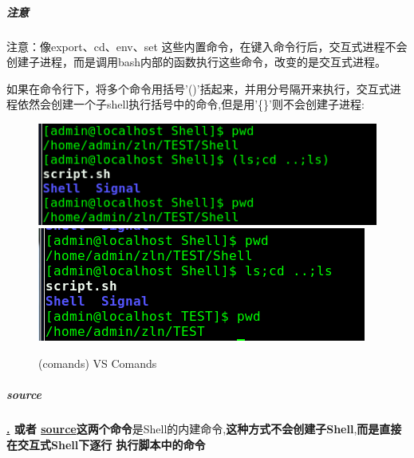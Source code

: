 \documentclass[UTF8,a4paper,12pt]{ctexbook}
\begin{document}
				 \subparagraph{注意}注意：像export、cd、env、set 这些内置命令，在键入命令行后，交互式进程不会创建子进程，而是调用bash内部的函数执行这些命令，改变的是交互式进程。
				 
				 如果在命令行下，将多个命令用括号'()'括起来，并用分号隔开来执行，交互式进程依然会创建一个子shell执行括号中的命令,但是用'\{\}'则不会创建子进程:
					 \begin{figure}[h]
					 	\begin{center}
						 	\includegraphics[scale = 0.5]{figure/ShellBracket.png}
						 	\includegraphics[scale = 0.5]{figure/ShellBracketNo.png}
						\end{center}
					 	\caption{(comands) VS Comands}
					 \end{figure}
				 
				 \subparagraph{source}
				 	\textbf{\underline{.} 或者 \underline{source}这两个命令}是Shell的内建命令,\textbf{这种方式不会创建子Shell},\textbf{而是直接在交互式Shell下逐行 执行脚本中的命令}
				 
\end{document}
